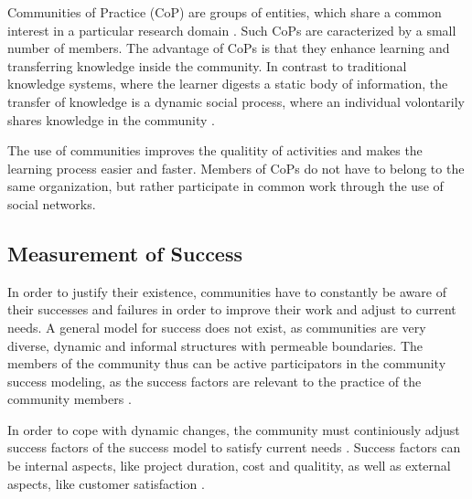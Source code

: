 Communities of Practice (CoP) are groups of entities, which share a common interest in a particular research domain \cite{Weng98}. Such CoPs are caracterized by a small number of members. The advantage of CoPs is that they enhance learning and transferring knowledge inside the community. In contrast to traditional knowledge systems, where the learner digests a static body of information, the transfer of knowledge is a dynamic social process, where an individual volontarily shares knowledge in the community \cite{AMMi15,Kern08}.

The use of communities improves the qualitity of activities and makes the learning process easier\cite{SaAr05} and faster\cite{CuZe05}. Members of CoPs do not have to belong to the same organization, but rather participate in common work through the use of social networks\cite{CuZe05}.

\subsection{Measurement of Success}
In order to justify their existence, communities have to constantly be aware of their successes and failures in order to improve their work and adjust to current needs. A general model for success does not exist, as communities are very diverse, dynamic and informal structures with permeable boundaries. The members of the community thus can be active participators in the community success modeling, as the success factors are relevant to the practice of the community members \cite{RKJa15}.

In order to cope with dynamic changes, the community must continiously adjust success factors of the success model to satisfy current needs . Success factors can be internal aspects, like project duration, cost and qualitity, as well as external aspects, like customer satisfaction \cite{AgRa06}.

